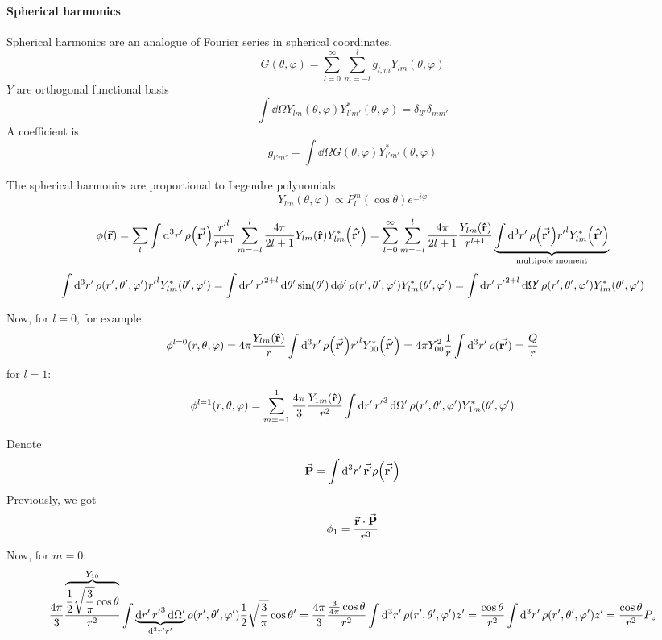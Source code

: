 \paragraph{Spherical harmonics}
Spherical harmonics are an analogue of Fourier series in spherical coordinates.
$$G(\theta, \varphi) = \sum_{l=0}^\infty \sum_{m=-l}^{l} g_{l,m} Y_{lm}(\theta, \varphi)$$
$Y$ are orthogonal functional basis
$$\int \dd{\Omega} Y_{lm} (\theta, \varphi) Y^{*}_{l'm'} (\theta, \varphi) = \delta_{ll'}\delta_{mm'} $$
A coefficient is
$$g_{l'm'} = \int  \dd{\Omega} G(\theta, \varphi) Y^{*}_{l'm'} (\theta, \varphi)  $$

The spherical harmonics are proportional to Legendre polynomials
$$Y_{lm}(\theta, \varphi) \propto P_{l}^m (\cos \theta) e^{\pm i \varphi}$$

$$\phi\qty(\va{r}) = \sum_l\int \dd[3]{r'} \rho\qty(\va{r'}) \frac{{r'}^l}{{r}^{l+1}} \sum_{m=-l}^l  \frac{4\pi}{2l+1}Y_{lm}\qty(\vu{r})Y^*_{lm}\qty(\vu{r'}) = \sum_{l=0}^\infty \sum_{m=-l}^l \frac{4\pi}{2l+1}  \frac{ Y_{lm}\qty(\vu{r})}{{r}^{l+1}} \underbrace{\int \dd[3]{r'} \rho\qty(\va{r'}) {r'}^l  Y^*_{lm}\qty(\vu{r'})}_{\text{multipole moment}}$$
$$\int \dd[3]{r'} \rho\qty(r',\theta',\varphi') {r'}^l   Y^*_{lm}\qty(\theta',\varphi') = \int \dd{r'} {r'}^{2+l} \dd{\theta'} \sin(\theta') \dd{\phi'} \rho\qty(r',\theta',\varphi')  Y^*_{lm}\qty(\theta',\varphi') = \int \dd{r'} {r'}^{2+l} \dd{\Omega'}  \rho\qty(r',\theta',\varphi')  Y^*_{lm}\qty(\theta',\varphi')$$

Now, for $l=0$, for example, 
$$\phi^{l=0}(r,\theta , \varphi) = 4\pi  \frac{ Y_{lm}\qty(\vu{r})}{r} \int \dd[3]{r'} \rho\qty(\va{r'}) {r'}^l  Y^*_{00}\qty(\vu{r'}) = 4\pi Y_{00}^2 \frac{1}{r} \int \dd[3]{r'} \rho(\va{r'}) = \frac{Q}{r}$$
for $l=1$:
$$\phi^{l=1}(r,\theta , \varphi) =\sum_{m=-1}^1 \frac{4\pi}{3}  \frac{ Y_{1m}\qty(\vu{r})}{r^2} \int \dd{r'} {r'}^{3} \dd{\Omega'}  \rho\qty(r',\theta',\varphi')  Y^*_{1m}\qty(\theta',\varphi')$$

Denote 
$$\va{P} = \int \dd[3]{r'} \va{r'} \rho\qty(\va{r'}) $$
Previously, we got
$$\phi_1 = \frac{\va{r} \vdot \va{P}}{r^3}$$
Now, for $m=0$:
$$ \frac{4\pi}{3}  \frac{ \overbrace{\frac{1}{2}\sqrt{\frac{3}{\pi}} \cos \theta}^{Y_{10}}}{r^2} \int \underbrace{\dd{r'} {r'}^{3} \dd{\Omega'} }_{\dd[3]{r'} r'} \rho\qty(r',\theta',\varphi') \frac{1}{2}\sqrt{\frac{3}{\pi}} \cos \theta' = \frac{4\pi}{3}\frac{\frac{3}{4\pi} \cos \theta}{r^2} \int \dd[3]{r'} \rho\qty(r',\theta',\varphi') z' =  \frac{\cos \theta}{r^2} \int \dd[3]{r'} \rho\qty(r',\theta',\varphi') z' = \frac{\cos \theta}{r^2}P_z$$


